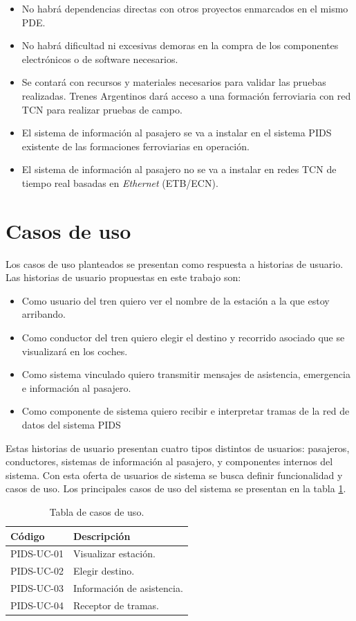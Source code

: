 \begin{itemize}
\item No habrá dependencias directas con otros proyectos enmarcados en el mismo PDE\citep{PDE-TCN}.
\item No habrá dificultad ni excesivas demoras en la compra de los componentes electrónicos o
de software necesarios.
\item Se contará con recursos y materiales necesarios para validar las pruebas realizadas.
Trenes Argentinos dará acceso a una formación ferroviaria con red TCN para realizar
pruebas de campo.
\item El sistema de información al pasajero se va a instalar en el sistema PIDS existente de las formaciones ferroviarias en operación.
\item El sistema de información al pasajero no se va a instalar en redes TCN de tiempo real
basadas en \textit{Ethernet} (ETB/ECN).
\end{itemize}


\section{Casos de uso}
Los casos de uso planteados se presentan como respuesta a historias de usuario. Las historias de usuario propuestas en este trabajo son:
\begin{itemize}
\item Como usuario del tren quiero ver el nombre de la estación a la que estoy arribando.
\item Como conductor del tren quiero elegir el destino y recorrido asociado que se visualizará en los coches.
\item Como sistema vinculado quiero transmitir mensajes de asistencia, emergencia e información al pasajero.
\item Como componente de sistema quiero recibir e interpretar tramas de la red de datos del sistema PIDS
\end{itemize}

Estas historias de usuario presentan cuatro tipos distintos de usuarios: pasajeros, conductores, sistemas de información al pasajero, y componentes internos del sistema. Con esta oferta de usuarios de sistema se busca definir funcionalidad y casos de uso. Los principales casos de uso del sistema se presentan en la tabla \ref{tab:UseCases}. \\

\begin{table}[htb]
\caption{Tabla de casos de uso.}
\label{tab:UseCases}
\begin{tabular}{|l|l|}
\hline
\textbf{Código} & \textbf{Descripción}     \\ \hline
PIDS-UC-01  & Visualizar estación.         \\ \hline
PIDS-UC-02  & Elegir destino.             \\ \hline
PIDS-UC-03  & Información de asistencia. \\ \hline
PIDS-UC-04  & Receptor de tramas.       \\ \hline
\end{tabular}
\end{table}

